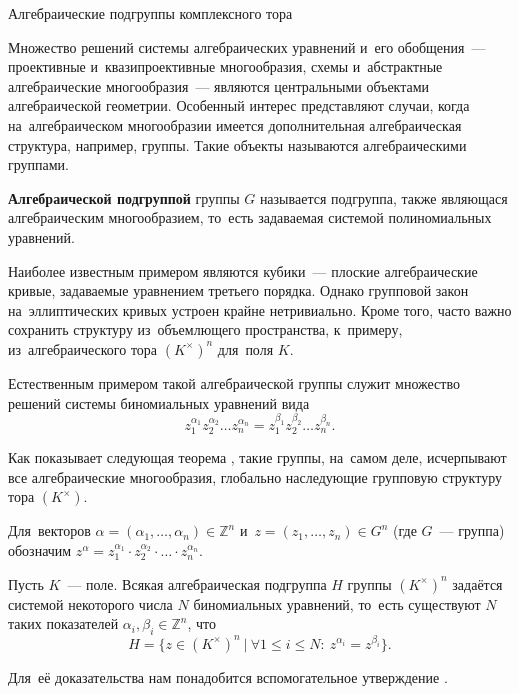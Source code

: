 \documentclass{article}
\begin{document}
\begin{center}
    \Large{Алгебраические подгруппы комплексного тора}
\end{center}


Множество решений системы алгебраических уравнений и его обобщения~— проективные и~квазипроективные многообразия,
схемы и~абстрактные алгебраические многообразия~— являются центральными объектами алгебраической геометрии.
Особенный интерес представляют случаи, когда на~алгебраическом многообразии имеется дополнительная алгебраическая структура,
например, группы. Такие объекты называются алгебраическими группами.

\textbf{Алгебраической подгруппой} группы $G$ называется подгруппа, также являющася
алгебраическим многообразием, то~есть задаваемая системой полиномиальных уравнений.

Наиболее известным примером являются кубики~— плоские алгебраические кривые, задаваемые уравнением третьего порядка.
Однако групповой закон на~эллиптических кривых устроен крайне нетривиально. Кроме того, часто важно сохранить структуру из~объемлющего пространства,
к~примеру, из~алгебраического тора $(K^\times)^n$ для~поля $K$.

Естественным примером такой алгебраической группы служит множество решений системы биномиальных уравнений вида
$$
    z_1^{\alpha_1} z_2^{\alpha_2} \ldots z_n^{\alpha_n} = z_1^{\beta_1} z_2^{\beta_2} \ldots z_n^{\beta_n}.
$$

Как показывает следующая теорема \cite{Schm94}, такие группы, на~самом деле, исчерпывают все алгебраические многообразия,
глобально наследующие групповую структуру тора $(K^\times)$.

Для~векторов $\alpha = (\alpha_1, \ldots, \alpha_n) \in \mathbb{Z}^n$ и~$z = (z_1, \ldots, z_n) \in G^n$ (где $G$~— группа)
обозначим $z^\alpha = z_1^{\alpha_1} \cdot z_2^{\alpha_2} \cdot \ldots \cdot z_n^{\alpha_n}$.

\begin{theorem*}[Шмидт]
    Пусть $K$~— поле. Всякая алгебраическая подгруппа $H$ группы $(K^{\times})^n$ задаётся
    системой некоторого числа $N$ биномиальных уравнений, то~есть существуют $N$ таких показателей $\alpha_i, \beta_i \in \mathbb{Z}^n$, что
    $$
        H = \{ z \in (K^{\times})^n\ |\ \forall 1 \leq i \leq N{:}\ z^{\alpha_i} = z^{\beta_i} \}.
    $$
\end{theorem*}

Для~её доказательства нам понадобится вспомогательное утверждение \cite{Art48}.
\end{document}
